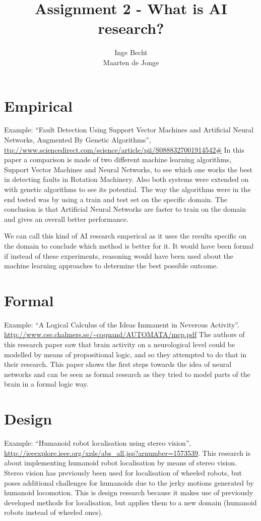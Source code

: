 \documentclass[a4paper, 12pt]{article}
\author{Inge Becht \\ Maarten de Jonge}
\title{Assignment 2 - What is AI research?}
\begin{document}
\maketitle

\section{Empirical}
Example: ``Fault Detection Using Support Vector Machines and Artificial Neural
Networks, Augmented By Genetic Algorithms'',
\url{ttp://www.sciencedirect.com/science/article/pii/S0888327001914542#}
In this paper a comparison is made of two different machine learning algorithms,
Support Vector Machines and Neural Networks, to see which one works the best in
detecting faults in Rotation Machinery. Also both systems were extended on with genetic algorithms to
see its potential. The way the algorithms were in the end tested was by using a
train and test set on the specific domain. The conclusion is that Artificial
Neural Networks are faster to train on the domain and gives an overall better
performance. 

We can call this kind of AI research emperical as it uses the results specific
on the domain to conclude which method is better for it. It would have been
formal if instead of these experiments, reasoning would have been used about the
machine learning approaches to determine the best possible outcome.


\section{Formal}
Example: ``A Logical Calculus of the Ideas Immanent in Neverous Activity''.
\url{http://www.cse.chalmers.se/~coquand/AUTOMATA/mcp.pdf}
The authors of this research paper saw that brain activity on a neurological
level could be modelled by means of propositional logic, and so they attempted
to do that in their research. This paper shows the first
steps towards the idea of neural networks and can be seen as formal research as
they tried to model parts of the brain in a formal logic way.

\section{Design}
Example: ``Humanoid robot localisation using stereo vision'',
\url{http://ieeexplore.ieee.org/xpls/abs\_all.jsp?arnumber=1573539}.
This research is about implementing humanoid robot localisation by means of
stereo vision. Stereo vision has previously been used for localisation of
wheeled robots, but poses additional challenges for humanoids due to the jerky
motions generated by humanoid locomotion.
This is design research because it makes use of previously developed methods for
localisation, but applies them to a new domain (humanoid robots instead of
wheeled ones).
\end{document}
